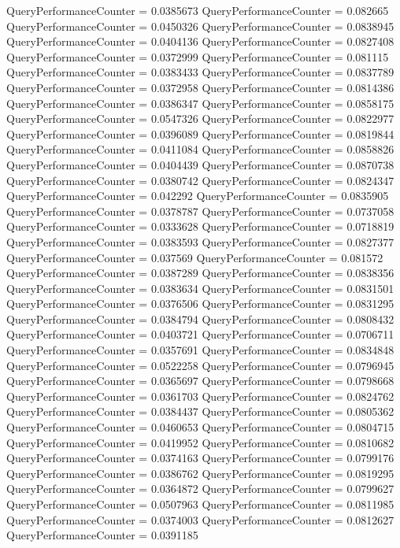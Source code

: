 \documentclass[9pt]{article}
\theoremstyle{plain}
\theoremstyle{definition}
\theoremstyle{remark}
\numberwithin{equation}{section}
\begin{document}
QueryPerformanceCounter  =  0.0385673
QueryPerformanceCounter  =  0.082665
QueryPerformanceCounter  =  0.0450326
QueryPerformanceCounter  =  0.0838945
QueryPerformanceCounter  =  0.0404136
QueryPerformanceCounter  =  0.0827408
QueryPerformanceCounter  =  0.0372999
QueryPerformanceCounter  =  0.081115
QueryPerformanceCounter  =  0.0383433
QueryPerformanceCounter  =  0.0837789
QueryPerformanceCounter  =  0.0372958
QueryPerformanceCounter  =  0.0814386
QueryPerformanceCounter  =  0.0386347
QueryPerformanceCounter  =  0.0858175
QueryPerformanceCounter  =  0.0547326
QueryPerformanceCounter  =  0.0822977
QueryPerformanceCounter  =  0.0396089
QueryPerformanceCounter  =  0.0819844
QueryPerformanceCounter  =  0.0411084
QueryPerformanceCounter  =  0.0858826
QueryPerformanceCounter  =  0.0404439
QueryPerformanceCounter  =  0.0870738
QueryPerformanceCounter  =  0.0380742
QueryPerformanceCounter  =  0.0824347
QueryPerformanceCounter  =  0.042292
QueryPerformanceCounter  =  0.0835905
QueryPerformanceCounter  =  0.0378787
QueryPerformanceCounter  =  0.0737058
QueryPerformanceCounter  =  0.0333628
QueryPerformanceCounter  =  0.0718819
QueryPerformanceCounter  =  0.0383593
QueryPerformanceCounter  =  0.0827377
QueryPerformanceCounter  =  0.037569
QueryPerformanceCounter  =  0.081572
QueryPerformanceCounter  =  0.0387289
QueryPerformanceCounter  =  0.0838356
QueryPerformanceCounter  =  0.0383634
QueryPerformanceCounter  =  0.0831501
QueryPerformanceCounter  =  0.0376506
QueryPerformanceCounter  =  0.0831295
QueryPerformanceCounter  =  0.0384794
QueryPerformanceCounter  =  0.0808432
QueryPerformanceCounter  =  0.0403721
QueryPerformanceCounter  =  0.0706711
QueryPerformanceCounter  =  0.0357691
QueryPerformanceCounter  =  0.0834848
QueryPerformanceCounter  =  0.0522258
QueryPerformanceCounter  =  0.0796945
QueryPerformanceCounter  =  0.0365697
QueryPerformanceCounter  =  0.0798668
QueryPerformanceCounter  =  0.0361703
QueryPerformanceCounter  =  0.0824762
QueryPerformanceCounter  =  0.0384437
QueryPerformanceCounter  =  0.0805362
QueryPerformanceCounter  =  0.0460653
QueryPerformanceCounter  =  0.0804715
QueryPerformanceCounter  =  0.0419952
QueryPerformanceCounter  =  0.0810682
QueryPerformanceCounter  =  0.0374163
QueryPerformanceCounter  =  0.0799176
QueryPerformanceCounter  =  0.0386762
QueryPerformanceCounter  =  0.0819295
QueryPerformanceCounter  =  0.0364872
QueryPerformanceCounter  =  0.0799627
QueryPerformanceCounter  =  0.0507963
QueryPerformanceCounter  =  0.0811985
QueryPerformanceCounter  =  0.0374003
QueryPerformanceCounter  =  0.0812627
QueryPerformanceCounter  =  0.0391185
\end{document}
